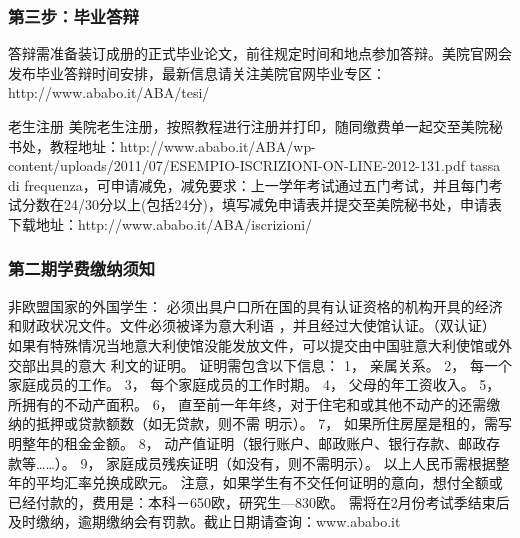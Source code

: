 \subsubsection{第三步：毕业答辩}
答辩需准备装订成册的正式毕业论文，前往规定时间和地点参加答辩。美院官网会发布毕业答辩时间安排，最新信息请关注美院官网毕业专区：http://www.ababo.it/ABA/tesi/


老生注册
美院老生注册，按照教程进行注册并打印，随同缴费单一起交至美院秘书处，教程地址：http://www.ababo.it/ABA/wp-content/uploads/2011/07/ESEMPIO-ISCRIZIONI-ON-LINE-2012-131.pdf
tassa di frequenza，可申请减免，减免要求：上一学年考试通过五门考试，并且每门考试分数在24/30分以上(包括24分)，填写减免申请表并提交至美院秘书处，申请表下载地址：http://www.ababo.it/ABA/iscrizioni/

\subsubsection{第二期学费缴纳须知}
非欧盟国家的外国学生： 必须出具户口所在国的具有认证资格的机构开具的经济和财政状况文件。文件必须被译为意大利语 ，并且经过大使馆认证。（双认证） 如果有特殊情况当地意大利使馆没能发放文件，可以提交由中国驻意大利使馆或外交部出具的意大 利文的证明。 证明需包含以下信息： 1， 亲属关系。 2， 每一个家庭成员的工作。 3， 每个家庭成员的工作时期。 4， 父母的年工资收入。 5， 所拥有的不动产面积。 6， 直至前一年年终，对于住宅和或其他不动产的还需缴纳的抵押或贷款额数（如无贷款，则不需 明示）。 7， 如果所住房屋是租的，需写明整年的租金金额。 8， 动产值证明（银行账户、邮政账户、银行存款、邮政存款等……）。 9， 家庭成员残疾证明（如没有，则不需明示）。 以上人民币需根据整年的平均汇率兑换成欧元。 注意，如果学生有不交任何证明的意向，想付全额或已经付款的，费用是：本科－650欧，研究生—830欧。 需将在2月份考试季结束后及时缴纳，逾期缴纳会有罚款。截止日期请查询：www.ababo.it


